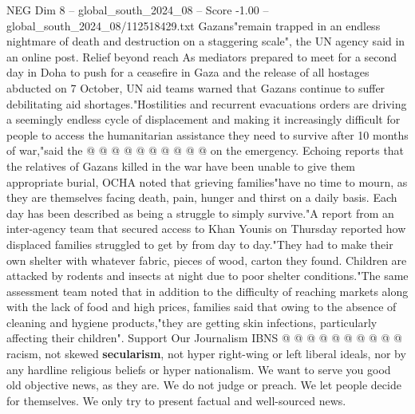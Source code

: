 \begin{textsample}{NEG Dim 8 – global\_south\_2024\_08 – Score -1.00 – global\_south\_2024\_08/112518429.txt}
Gazans"remain trapped in an endless nightmare of death and destruction on a staggering scale", the UN agency said in an online post.
Relief beyond reach As mediators prepared to meet for a second day in Doha to push for a ceasefire in Gaza and the release of all hostages abducted on 7 October, UN aid teams warned that Gazans continue to suffer debilitating aid shortages."Hostilities and recurrent evacuations orders are driving a seemingly endless cycle of displacement and making it increasingly difficult for people to access the humanitarian assistance they need to survive after 10 months of war,"said the @ @ @ @ @ @ @ @ @ @ on the emergency.
Echoing reports that the relatives of Gazans killed in the war have been unable to give them appropriate burial, OCHA noted that grieving families"have no time to mourn, as they are themselves facing death, pain, hunger and thirst on a daily basis.
Each day has been described as being a struggle to simply survive."A report from an inter-agency team that secured access to Khan Younis on Thursday reported how displaced families struggled to get by from day to day."They had to make their own shelter with whatever fabric, pieces of wood, carton they found.
Children are attacked by rodents and insects at night due to poor shelter conditions."The same assessment team noted that in addition to the difficulty of reaching markets along with the lack of food and high prices, families said that owing to the absence of cleaning and hygiene products,"they are getting skin infections, particularly affecting their children".
Support Our Journalism IBNS @ @ @ @ @ @ @ @ @ @ racism, not skewed \textbf{secularism}, not hyper right-wing or left liberal ideals, nor by any hardline religious beliefs or hyper nationalism.
We want to serve you good old objective news, as they are.
We do not judge or preach.
We let people decide for themselves.
We only try to present factual and well-sourced news.

\end{textsample}
